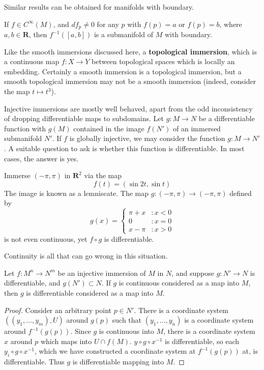 Similar results can be obtained for manifolds with boundary.

\begin{theorem}
    If $f \in C^\infty(M)$, and $df_p \neq 0$ for any $p$ with $f(p) = a$ or $f(p) = b$, where $a,b \in \mathbf{R}$, then $f^{-1}([a,b])$ is a submanifold of $M$ with boundary.
\end{theorem}

Like the smooth immersions discussed here, a {\bf topological immersion}, which is a continuous map $f: X \to Y$ between topological spaces which is locally an embedding. Certainly a smooth immersion is a topological immersion, but a smooth topological immersion may not be a smooth immersion (indeed, consider the map $t \mapsto t^3$).

Injective immersions are mostly well behaved, apart from the odd inconsistency of dropping differentiable maps to subdomains. Let $g:M \to N$ be a differentiable function with $g(M)$ contained in the image $f(N')$ of an immersed submanifold $N'$. If $f$ is globally injective, we may consider the function $g:M \to N'$. A suitable question to ask is whether this function is differentiable. In most cases, the answer is yes.

\begin{example}
    Immerse $(-\pi, \pi)$ in $\mathbf{R}^2$ via the map
    \[ f(t) = (\sin 2t, \sin t) \]
    The image is known as a lemniscate. The map $g:(-\pi, \pi) \to (-\pi, \pi)$ defined by
    \[ g(x) = \begin{cases} \pi + x &: x < 0 \\ 0 &: x = 0 \\ x - \pi &: x > 0 \end{cases} \]
    is not even continuous, yet $f \circ g$ is differentiable.
\end{example}

Continuity is all that can go wrong in this situation.

\begin{theorem}
    Let $f:M^n \to N^m$ be an injective immersion of $M$ in $N$, and suppose $g: N' \to N$ is differentiable, and $g(N') \subset N$. If $g$ is continuous considered as a map into $M$, then $g$ is differentiable considered as a map into $M$.
\end{theorem}
\begin{proof}
    Consider an arbitrary point $p \in N'$. There is a coordinate system $((y_1, \dots, y_m),U)$ around $g(p)$ such that $(y_1, \dots, y_n)$ is a coordinate system around $f^{-1}(g(p))$. Since $g$ is continuous into $M$, there is a coordinate system $x$ around $p$ which maps into $U \cap f(M)$. $y \circ g \circ x^{-1}$ is differentiable, so each $y_i \circ g \circ x^{-1}$, which we have constructed a coordinate system at $f^{-1}(g(p))$ at, is differentiable. Thus $g$ is differentiable mapping into $M$.
\end{proof}

